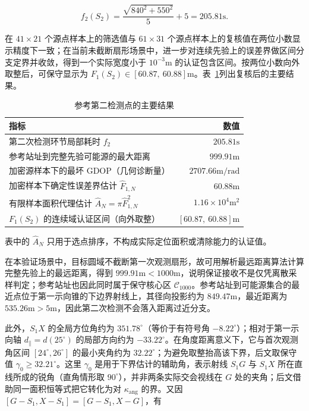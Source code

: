 \[
f_2(S_2)
=
\frac{\sqrt{840^2+550^2}}{5}+5
=
205.81\mathrm{s}.
\]

在 $41\times21$ 个源点样本上的筛选值与 $61\times31$ 个源点样本上的复核值在两位小数显示精度下一致；在当前未截断扇形场景中，进一步对连续先验上的误差界做区间分支定界并收敛，得到一个实际宽度小于 $10^{-3}\mathrm{m}$ 的认证包含区间。按两位小数向外取整后，可保守显示为 $F_1(S_2)\in[60.87,\ 60.88]\mathrm{m}$。表~\ref{tab:q2_main_results}列出复核后的主要结果。



\begin{table}[htbp]
\centering
\caption{参考第二检测点的主要结果}
\label{tab:q2_main_results}
\begin{tabular}{lr}
\toprule
指标 & 数值 \\
\midrule
第二次检测环节局部耗时 $f_2$ & $205.81\mathrm{s}$ \\
参考站址到完整先验可能源的最大距离 & $999.91\mathrm{m}$ \\
加密源样本下的最坏 GDOP（几何诊断量） & $2707.66\mathrm{m/rad}$ \\
加密样本下确定性误差界估计 $\widehat F_{1,N}$ & $60.88\mathrm{m}$ \\
有限样本面积代理估计 $\widehat A_N=\pi\widehat F_{1,N}^2$ & $1.16\times10^4\mathrm{m^2}$ \\
$F_1(S_2)$ 的连续域认证区间（向外取整） & $[60.87,\ 60.88]\mathrm{m}$ \\
\bottomrule
\end{tabular}
\end{table}

表中的 $\widehat A_N$ 只用于选点排序，不构成实际定位面积或清除能力的认证值。

在本验证场景中，目标圆域不截断第一次观测扇形，故可用解析最远距离算法计算完整先验上的最远距离，得到 $999.91\mathrm{m}<1000\mathrm{m}$，说明保证接收不是仅凭离散采样判定；参考站址也因此同时属于保守核心区 $\mathcal C_{1000}$。参考站址到可能源集合的最近点位于第一示向锥的下边界射线上，其径向投影约为 $849.47\mathrm{m}$，最近距离为 $535.26\mathrm{m}>5\mathrm{m}$，因此第二次检测不会落入距离过近分支。

此外，$S_1X$ 的全局方位角约为 $351.78^\circ$（等价于有符号角 $-8.22^\circ$）；相对于第一示向轴 $d_\parallel=d(25^\circ)$ 的局部方向约为 $-33.22^\circ$。在角度距离意义下，它与首次观测角区间 $[24^\circ,26^\circ]$ 的最小夹角约为 $32.22^\circ$；为避免取整抬高该下界，后文取保守值 $\gamma_0\ge32.21^\circ$。这里 $\gamma_0$ 是用于下界估计的辅助角，表示射线 $S_1G$ 与 $S_1X$ 所在直线所成的锐角（直角情形取 $90^\circ$），并非两条实际交会视线在 $G$ 处的夹角；后文借助同一面积恒等式把它转化为对 $\kappa_{\mathrm{ang}}$ 的界。又因 $[G-S_1,X-S_1]=[G-S_1,X-G]$，有

